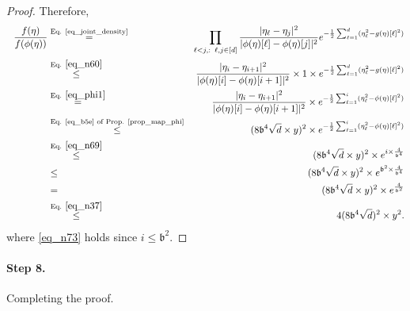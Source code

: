 \documentclass[11pt,letterpaper]{article}
\begin{document}
\begin{proof}
\noindent
Therefore,
\begin{eqnarray}
\ \   \frac{f(\eta)}{f(\phi(\eta))}
    &\stackrel{\textrm{Eq. \eqref{eq_joint_density}}}{=} & \prod_{\ell<j,  :\, \, \, \ell,j \in [d]} \frac{| \eta_{\ell} - \eta_j|^2}{| \phi(\eta)[\ell] - \phi(\eta)[j]|^2} e^{-\frac{1}{2} \sum_{\ell=1}^{d}  (\eta_{\ell}^2 - g(\eta)[\ell]^2 )}\nonumber\\
    &\stackrel{\textrm{Eq. } \eqref{eq_n60}}{\leq}& \frac{| \eta_{i} - \eta_{i+1}|^2}{| \phi(\eta)[i] - \phi(\eta)[i+1]|^2} \times 1 \times  e^{-\frac{1}{2} \sum_{\ell=1}^{d}  (\eta_{\ell}^2 - g(\eta)[\ell]^2 )}\nonumber\\
%  
   &\stackrel{\textrm{Eq. } \eqref{eq_phi1}}=&   \frac{| \eta_{i} - \eta_{i+1}|^2}{| \phi(\eta)[i] - \phi(\eta)[i+1]|^2} \times e^{-\frac{1}{2} \sum_{\ell=1}^{i}  (\eta_{\ell}^2 - \phi(\eta)[\ell]^2 )}\nonumber\\
%
  &\stackrel{\textrm{Eq. \eqref{eq_b5e} of Prop. \ref{prop_map_phi}}}{\leq}& ( 8 \mathfrak{b}^4 \sqrt{d}  \times y)^2  \times e^{-\frac{1}{2} \sum_{\ell=1}^{i}  (\eta_{\ell}^2 - \phi(\eta)[\ell]^2 )}\nonumber\\
    &\stackrel{\textrm{Eq. } \eqref{eq_n69}}{\leq}& ( 8 \mathfrak{b}^4 \sqrt{d}  \times y)^2  \times e^{i \times \frac{4}{\mathfrak{b}^4}} \nonumber\\
        &\leq& ( 8 \mathfrak{b}^4 \sqrt{d}  \times y)^2  \times e^{\mathfrak{b}^2 \times \frac{4}{\mathfrak{b}^4}} \label{eq_n73}\\
                &=& ( 8 \mathfrak{b}^4 \sqrt{d}  \times y)^2  \times e^{\frac{4}{\mathfrak{b}^2}} \nonumber\\
                   &\stackrel{\textrm{Eq. } \eqref{eq_n37}}{\leq} & 4 (8 \mathfrak{b}^4 \sqrt{d})^2 \times y^2.\nonumber\\
%
 \end{eqnarray}
 where \eqref{eq_n73} holds since $i \leq \mathfrak{b}^2$.
%
%
\end{proof}




\paragraph{Step 8.} Completing the proof.
\end{document}
